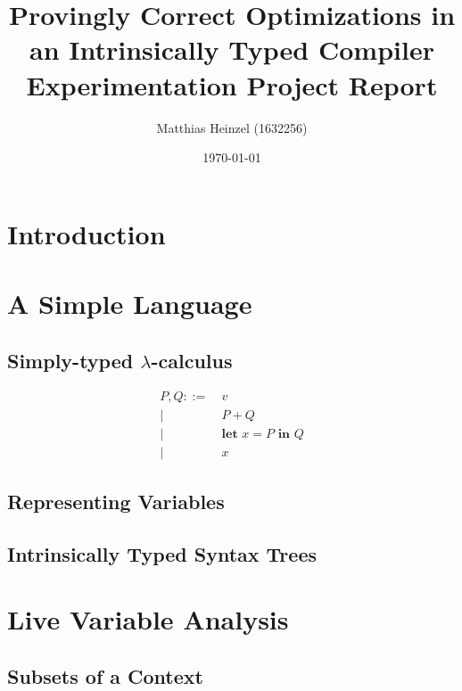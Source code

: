 \documentclass[11pt,a4paper]{article}
\title{Provingly Correct Optimizations in an Intrinsically Typed Compiler\\
  \vspace{1cm}
  \large Experimentation Project Report}
\author{Matthias Heinzel (1632256)}
\date{\today}
\begin{document}
\maketitle
\tableofcontents


\section{Introduction}


\section{A Simple Language}

\subsection{Simply-typed $\lambda$-calculus}

\begin{align*}
  P, Q ::=&\ v
  \\ \big|&\ P + Q
  \\ \big|&\ \textbf{let } x = P \textbf{ in } Q
  \\ \big|&\ x
\end{align*}

\subsection{Representing Variables}

\subsection{Intrinsically Typed Syntax Trees}

\CodeLangSyntax


\section{Live Variable Analysis}

\subsection{Subsets of a Context}
\cite{chapman2009type}
\end{document}
